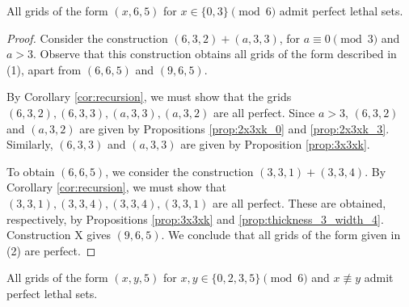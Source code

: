 \begin{lem}
\label{lem:thickness_5_case_2}
All grids of the form $(x,6,5)$ for $x \in \{0,3\} \pmod 6$ admit perfect lethal sets.
\end{lem}

\begin{proof}
Consider the construction $(6,3,2) + (a,3,3)$, for $a \equiv 0 \pmod 3$ and $a >3$. Observe that this construction obtains all grids of the form described in (1), apart from $(6,6,5)$ and $(9,6,5)$.

By Corollary \ref{cor:recursion}, we must show that the grids $(6,3,2), (6,3,3), (a,3,3), (a,3,2)$ are all perfect. Since $a >3$, $(6,3,2)$ and $(a,3,2)$ are given by Propositions \ref{prop:2x3xk_0} and \ref{prop:2x3xk_3}. Similarly, $(6,3,3)$ and $(a,3,3)$ are given by Proposition \ref{prop:3x3xk}.

To obtain $(6,6,5)$, we consider the construction $(3,3,1)+(3,3,4)$. By Corollary \ref{cor:recursion}, we must show that $(3,3,1), (3,3,4), (3,3,4), (3,3,1)$ are all perfect. These are obtained, respectively, by Propositions \ref{prop:3x3xk} and \ref{prop:thickness_3_width_4}. Construction X gives $(9,6,5)$. We conclude that all grids of the form given in (2) are perfect.
\end{proof}

\begin{lem}
\label{lem:thickness_5_case_3}
All grids of the form $(x,y,5)$ for $x,y \in \{0,2,3,5\} \pmod 6$ and $x \not\equiv y$ admit perfect lethal sets.
\end{lem}

